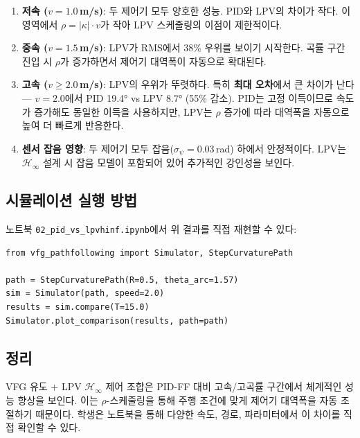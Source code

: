 \begin{enumerate}[nosep]
    \item \textbf{저속 ($v = 1.0$\,m/s)}: 두 제어기 모두 양호한 성능. PID와 LPV의 차이가 작다.
    이 영역에서 $\rho = |\kappa| \cdot v$가 작아 LPV 스케줄링의 이점이 제한적이다.

    \item \textbf{중속 ($v = 1.5$\,m/s)}: LPV가 RMS에서 38\% 우위를 보이기 시작한다.
    곡률 구간 진입 시 $\rho$가 증가하면서 제어기 대역폭이 자동으로 확대된다.

    \item \textbf{고속 ($v \geq 2.0$\,m/s)}: LPV의 우위가 뚜렷하다.
    특히 \textbf{최대 오차}에서 큰 차이가 난다 --- $v = 2.0$에서 PID 19.4° vs LPV 8.7° (55\% 감소).
    PID는 고정 이득이므로 속도가 증가해도 동일한 이득을 사용하지만,
    LPV는 $\rho$ 증가에 따라 대역폭을 자동으로 높여 더 빠르게 반응한다.

    \item \textbf{센서 잡음 영향}: 두 제어기 모두 잡음($\sigma_\psi = 0.03$\,rad) 하에서 안정적이다.
    LPV는 $\mathcal{H}_\infty$ 설계 시 잡음 모델이 포함되어 있어 추가적인 강인성을 보인다.
\end{enumerate}

\subsection{시뮬레이션 실행 방법}

노트북 \texttt{02\_pid\_vs\_lpvhinf.ipynb}에서 위 결과를 직접 재현할 수 있다:

\begin{verbatim}
from vfg_pathfollowing import Simulator, StepCurvaturePath

path = StepCurvaturePath(R=0.5, theta_arc=1.57)
sim = Simulator(path, speed=2.0)
results = sim.compare(T=15.0)
Simulator.plot_comparison(results, path=path)
\end{verbatim}

\subsection{정리}

VFG 유도 + LPV $\mathcal{H}_\infty$ 제어 조합은 PID-FF 대비 고속/고곡률 구간에서
체계적인 성능 향상을 보인다.
이는 $\rho$-스케줄링을 통해 주행 조건에 맞게 제어기 대역폭을 자동 조절하기 때문이다.
학생은 노트북을 통해 다양한 속도, 경로, 파라미터에서 이 차이를 직접 확인할 수 있다.
